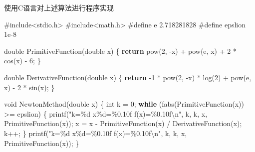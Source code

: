 \documentclass[
]{article}
\newenvironment{Shaded}{}{}
\newcommand{\ControlFlowTok}[1]{\textcolor[rgb]{0.00,0.44,0.13}{\textbf{#1}}}
\newcommand{\DataTypeTok}[1]{\textcolor[rgb]{0.56,0.13,0.00}{#1}}
\newcommand{\DecValTok}[1]{\textcolor[rgb]{0.25,0.63,0.44}{#1}}
\newcommand{\ImportTok}[1]{#1}
\newcommand{\NormalTok}[1]{#1}
\newcommand{\OperatorTok}[1]{\textcolor[rgb]{0.40,0.40,0.40}{#1}}
\newcommand{\PreprocessorTok}[1]{\textcolor[rgb]{0.74,0.48,0.00}{#1}}
\newcommand{\SpecialCharTok}[1]{\textcolor[rgb]{0.25,0.44,0.63}{#1}}
\newcommand{\StringTok}[1]{\textcolor[rgb]{0.25,0.44,0.63}{#1}}
\begin{document}
使用C语言对上述算法进行程序实现

\begin{Shaded}
\begin{Highlighting}[]
\PreprocessorTok{\#include}\ImportTok{\textless{}stdio.h\textgreater{}}
\PreprocessorTok{\#include}\ImportTok{\textless{}math.h\textgreater{}}
\PreprocessorTok{\#define e 2.718281828}
\PreprocessorTok{\#define epslion 1e{-}8}

\DataTypeTok{double}\NormalTok{ PrimitiveFunction}\OperatorTok{(}\DataTypeTok{double}\NormalTok{ x}\OperatorTok{)}
\OperatorTok{\{}
	\ControlFlowTok{return}\NormalTok{ pow}\OperatorTok{(}\DecValTok{2}\OperatorTok{,} \OperatorTok{{-}}\NormalTok{x}\OperatorTok{)} \OperatorTok{+}\NormalTok{ pow}\OperatorTok{(}\NormalTok{e}\OperatorTok{,}\NormalTok{ x}\OperatorTok{)} \OperatorTok{+} \DecValTok{2} \OperatorTok{*}\NormalTok{ cos}\OperatorTok{(}\NormalTok{x}\OperatorTok{)} \OperatorTok{{-}} \DecValTok{6}\OperatorTok{;}
\OperatorTok{\}}

\DataTypeTok{double}\NormalTok{ DerivativeFunction}\OperatorTok{(}\DataTypeTok{double}\NormalTok{ x}\OperatorTok{)}
\OperatorTok{\{}
	\ControlFlowTok{return} \OperatorTok{{-}}\DecValTok{1} \OperatorTok{*}\NormalTok{ pow}\OperatorTok{(}\DecValTok{2}\OperatorTok{,} \OperatorTok{{-}}\NormalTok{x}\OperatorTok{)} \OperatorTok{*}\NormalTok{ log}\OperatorTok{(}\DecValTok{2}\OperatorTok{)} \OperatorTok{+}\NormalTok{ pow}\OperatorTok{(}\NormalTok{e}\OperatorTok{,}\NormalTok{ x}\OperatorTok{)} \OperatorTok{{-}} \DecValTok{2} \OperatorTok{*}\NormalTok{ sin}\OperatorTok{(}\NormalTok{x}\OperatorTok{);}
\OperatorTok{\}}

\DataTypeTok{void}\NormalTok{ NewtonMethod}\OperatorTok{(}\DataTypeTok{double}\NormalTok{ x}\OperatorTok{)}
\OperatorTok{\{}
	\DataTypeTok{int}\NormalTok{ k }\OperatorTok{=} \DecValTok{0}\OperatorTok{;}
	\ControlFlowTok{while} \OperatorTok{(}\NormalTok{fabs}\OperatorTok{(}\NormalTok{PrimitiveFunction}\OperatorTok{(}\NormalTok{x}\OperatorTok{))} \OperatorTok{\textgreater{}=}\NormalTok{ epslion}\OperatorTok{)}
	\OperatorTok{\{}
\NormalTok{		printf}\OperatorTok{(}\StringTok{"k=\%d	x\%d=\%0.10f		f(x)=\%0.10f}\SpecialCharTok{\textbackslash{}n}\StringTok{"}\OperatorTok{,}\NormalTok{ k}\OperatorTok{,}\NormalTok{ k}\OperatorTok{,}\NormalTok{ x}\OperatorTok{,}\NormalTok{ PrimitiveFunction}\OperatorTok{(}\NormalTok{x}\OperatorTok{));}
\NormalTok{		x }\OperatorTok{=}\NormalTok{ x }\OperatorTok{{-}}\NormalTok{ PrimitiveFunction}\OperatorTok{(}\NormalTok{x}\OperatorTok{)} \OperatorTok{/}\NormalTok{ DerivativeFunction}\OperatorTok{(}\NormalTok{x}\OperatorTok{);}
\NormalTok{		k}\OperatorTok{++;}
	\OperatorTok{\}}
\NormalTok{	printf}\OperatorTok{(}\StringTok{"k=\%d	x\%d=\%0.10f		f(x)=\%0.10f}\SpecialCharTok{\textbackslash{}n}\StringTok{"}\OperatorTok{,}\NormalTok{ k}\OperatorTok{,}\NormalTok{ k}\OperatorTok{,}\NormalTok{ x}\OperatorTok{,}\NormalTok{ PrimitiveFunction}\OperatorTok{(}\NormalTok{x}\OperatorTok{));}
\OperatorTok{\}}


\end{Highlighting}
\end{Shaded}
\end{document}
